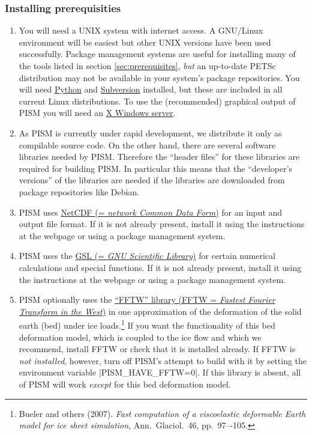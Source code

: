 \documentclass[11pt,final]{amsart}
\begin{document}
\subsubsection{Installing prerequisities}
\renewcommand{\labelenumi}{\textbf{\arabic{enumi}.}~}
\begin{enumerate}
\item You will need a UNIX system with internet access. A GNU/Linux environment will be easiest but other UNIX versions have been
  used successfully. Package management systems are useful for installing many of the tools listed in section
  \ref{sec:prerequisites}, \emph{but} an up-to-date PETSc distribution may not be available in your system's package
  repositories. You will need \href{http://www.python.org/}{Python} and \href{http://subversion.tigris.org/}{Subversion}
  installed, but these are included in all current Linux distributions. To use the (recommended) graphical output of PISM you will
  need an \href{http://www.x.org/}{X Windows server}.

\item As PISM is currently under rapid development, we distribute it only as compilable source code. On the other hand, there are
  several software libraries needed by PISM. Therefore the ``header files'' for these libraries are required for building PISM. In
  particular this means that the ``developer's versions'' of the libraries are needed if the libraries are downloaded from package
  repositories like Debian.

\item PISM uses \href{http://www.unidata.ucar.edu/software/netcdf/}{NetCDF (= \emph{network Common Data Form})} for
  an input and output file format. If it is not already present, install it using the instructions at the webpage or using a
  package management system.

\item PISM uses the \href{http://www.gnu.org/software/gsl/}{GSL (= \emph{GNU Scientific Library})} for certain numerical calculations and special functions. If it is not already present, install it using the
  instructions at the webpage or using a package management system.

\item PISM optionally uses the \href{http://www.fftw.org/}{``FFTW'' library (FFTW = \emph{Fastest Fourier Transform in the
      West})} in one approximation of the deformation of the solid earth (bed) under
  ice loads.\footnote{Bueler and others (2007). \emph{Fast computation of a viscoelastic deformable Earth model for ice sheet simulation}, Ann.~Glaciol.~46, pp.~97–-105.}  If you want the functionality of this bed deformation model, which is coupled to the ice flow and which we
  recommend, install FFTW or check that it is installed already.  If FFTW is \emph{not installed}, however, turn off PISM's attempt
  to build with it by setting the environment variable |PISM_HAVE_FFTW=0|.  If this library is absent, all of PISM will work
  \emph{except} for this bed deformation model.


\end{enumerate}
\end{document}
